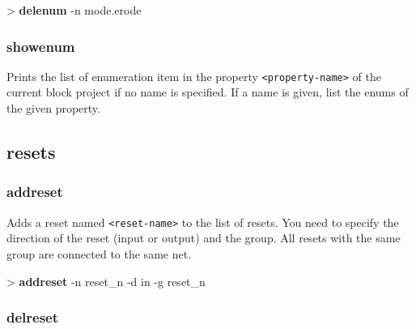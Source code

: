 \documentclass[10pt,a4paper]{article}
\begin{document}
{\begin{sampletitle}
> \textbf{\tool{} delenum} -n mode.erode
\end{sampletitle}


\subsubsection{showenum}
\label{subsec:showenum}

Prints the list of enumeration item in the property \texttt{<property-name>} of the current block project if no name is specified. If a name is given, list the enums of the given property.
}

\subsection{resets}
\subsubsection{addreset}
\label{subsec:addreset}

Adds a reset named \texttt{<reset-name>} to the list of resets. You need to specify the direction of the reset (input or output) and the group. All resets with the same group are connected to the same net.\\


\begin{sampletitle}
> \textbf{\tool{} addreset} -n reset\_n -d in -g reset\_n
\end{sampletitle}


\subsubsection{delreset}
\label{subsec:delreset}
\end{document}
